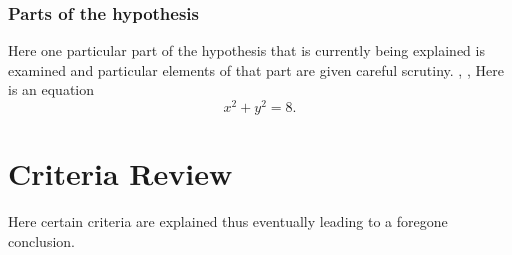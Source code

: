 \subsubsection{Parts of the hypothesis}

Here one particular part of the hypothesis that is 
currently being explained is examined and particular
elements of that part are given careful scrutiny. \autocite{chenGraphHomotopyGraham2001}, \autocite{chenGraphHomotopyGraham2001},\autocite{virkContractibilityRipsComplexes2024}
Here is an equation \[x^2 + y^2 = 8.\]



\section{Criteria Review}

Here certain criteria are explained thus eventually
leading to a foregone conclusion.

\printbibliography[heading=subbibnumbered]

